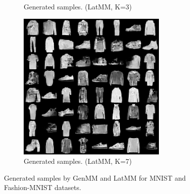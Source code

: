 \begin{figure}[!ht]
\begin{subfigure}[b]{0.24\textwidth}
    \caption{Generated samples. (LatMM, K=3)}
  \end{subfigure}
  \begin{subfigure}[b]{0.24\textwidth}
    \centering
    \includegraphics[width=1\linewidth]{images/fashion-mnist/samples/gen_s7_std1.png}
    \caption{Generated samples. (LatMM, K=7)}
  \end{subfigure}
  \vspace{-0.3cm}
  \caption{Generated samples by GenMM and LatMM for MNIST and Fashion-MNIST datasets.}\label{fig-demo-samples}
\end{figure}

